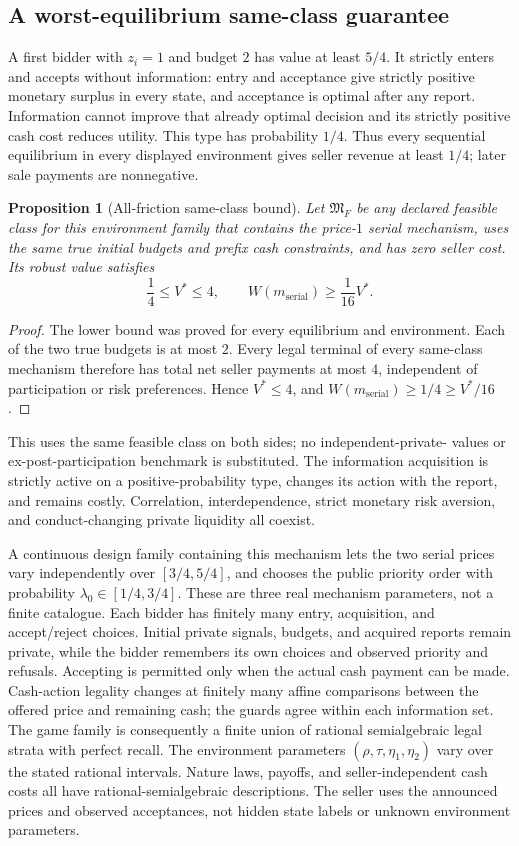 \documentclass[11pt,a4paper]{article}
\numberwithin{equation}{section}
\newtheorem{proposition}[theorem]{Proposition}
\theoremstyle{definition}
\begin{document}
\subsection{A worst-equilibrium same-class guarantee}
A first bidder with \(z_i=1\) and budget \(2\) has value at least
\(5/4\). It strictly enters and accepts without information:
entry and acceptance give strictly positive monetary surplus in
every state, and acceptance is optimal after any report.
Information cannot improve that already optimal decision and its
strictly positive cash cost reduces utility.
This type has probability \(1/4\).
Thus every sequential equilibrium in every displayed environment gives
seller revenue at least \(1/4\); later sale payments are nonnegative.

\begin{proposition}[All-friction same-class bound]\label{prop:ratio}
Let \(\mathfrak M_F\) be any declared feasible class for this environment
family that contains the price-\(1\) serial mechanism, uses the same
true initial budgets and prefix cash constraints, and has zero seller
cost. Its robust value satisfies
\[
 \frac14\le V^*\le4,
 \qquad W(m_{\mathrm{serial}})\ge\frac1{16}V^*.
\]
\end{proposition}
\begin{proof}
The lower bound was proved for every equilibrium and environment.
Each of the two true budgets is at most \(2\).
Every legal terminal of every same-class mechanism therefore has
total net seller payments at most \(4\), independent of participation
or risk preferences. Hence \(V^*\le4\), and
\(W(m_{\mathrm{serial}})\ge1/4\ge V^*/16\).
\end{proof}
This uses the same feasible class on both sides; no independent-private-
values or ex-post-participation benchmark is substituted.
The information acquisition is strictly active on a positive-probability
type, changes its action with the report, and remains costly.
Correlation, interdependence, strict monetary risk aversion, and
conduct-changing private liquidity all coexist.

A continuous design family containing this mechanism lets the two
serial prices vary independently over \([3/4,5/4]\), and chooses the
public priority order with probability \(\lambda_0\in[1/4,3/4]\).
These are three real mechanism parameters, not a finite catalogue.
Each bidder has finitely many entry, acquisition, and accept/reject
choices. Initial private signals, budgets, and acquired reports remain
private, while the bidder remembers its own choices and observed
priority and refusals.
Accepting is permitted only when the actual cash payment can be made.
Cash-action legality changes at finitely many affine comparisons
between the offered price and remaining cash; the guards agree within
each information set.
The game family is consequently a finite union of rational
semialgebraic legal strata with perfect recall.
The environment parameters
\((\rho,\tau,\eta_1,\eta_2)\) vary over the stated rational intervals.
Nature laws, payoffs, and seller-independent cash costs all have
rational-semialgebraic descriptions.
The seller uses the announced prices and observed acceptances, not
hidden state labels or unknown environment parameters.
\end{document}

